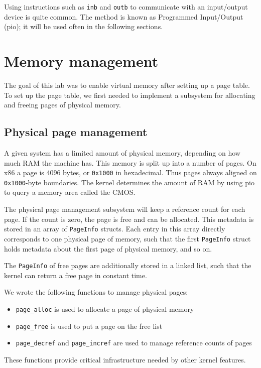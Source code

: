 \documentclass{article}
\begin{document}
Using instructions such as \texttt{inb} and \texttt{outb} to communicate with
an input/output device is quite common. The method is known as Programmed
Input/Output (\gls{pio}); it will be used often in the following sections.



\section{Memory management}
\label{sec:mem}
The goal of this lab was to enable virtual memory after setting up a page
table. To set up the page table, we first needed to implement a subsystem
for allocating and freeing pages of physical memory.


\subsection{Physical page management}
A given system has a limited amount of physical memory, depending on how much
RAM the machine has. This memory is split up into a number of pages. On x86 a
page is 4096 bytes, or \texttt{0x1000} in hexadecimal. Thus pages always aligned on
\texttt{0x1000}-byte boundaries. The kernel determines the amount of RAM by using
\gls{pio} to query a memory area called the CMOS. 

The physical page management subsystem will keep a reference count for each
page. If the count is zero, the page is free and can be allocated. This
metadata is stored in an array of \texttt{PageInfo} structs. Each entry in
this array directly corresponds to one physical page of memory, such that the
first \texttt{PageInfo} struct holds metadata about the first page of physical
memory, and so on.

The \texttt{PageInfo} of free pages are additionally stored in a linked list,
such that the kernel can return a free page in constant time.

We wrote the following functions to manage physical pages:
\begin{itemize}
\item \texttt{page\_alloc} is used to allocate a page of physical memory
\item \texttt{page\_free} is used to put a page on the free list
\item \texttt{page\_decref} and \texttt{page\_incref} are used to manage
reference counts of pages
\end{itemize}
These functions provide critical infrastructure needed by other kernel
features.
\end{document}
